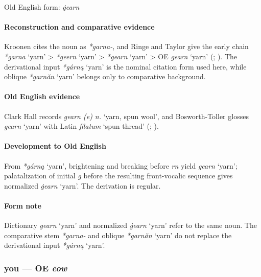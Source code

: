 \documentclass[
  british,
  a4paper,
]{article}
\providecommand{\Recon}[1]{\emph{*#1}}
\begin{document}
Old English form: \emph{ġearn}

\paragraph{Reconstruction and comparative
evidence}\label{reconstruction-and-comparative-evidence-83}

Kroonen cites the noun as \emph{*garna-}, and Ringe and Taylor give the
early chain \Recon{garna} `yarn' \textgreater{} \Recon{geern} `yarn'
\textgreater{} \Recon{gearn} `yarn' \textgreater{} OE {\emph{gearn}}
`yarn' (;
). The
derivational input \Recon{gárną} `yarn' is the nominal citation form
used here, while oblique \Recon{garnăn} `yarn' belongs only to
comparative background.

\paragraph{Old English evidence}\label{old-english-evidence-85}

Clark Hall records \emph{gearn (e) n.} `yarn, spun wool', and
Bosworth-Toller glosses {\emph{gearn}} `yarn' with Latin \emph{filatum}
`spun thread' (;
).

\paragraph{Development to Old
English}\label{development-to-old-english-83}

From \Recon{gárną} `yarn', brightening and breaking before \emph{rn}
yield \emph{gearn} `yarn'; palatalization of initial \emph{g} before the
resulting front-vocalic sequence gives normalized \emph{ġearn} `yarn'.
The derivation is regular.

\paragraph{Form note}\label{form-note-26}

Dictionary \emph{gearn} `yarn' and normalized \emph{ġearn} `yarn' refer
to the same noun. The comparative stem \emph{*garna-} and oblique
\Recon{garnăn} `yarn' do not replace the derivational input
\Recon{gárną} `yarn'.

\subsubsection{\texorpdfstring{you --- OE
\emph{ēow}}{you --- OE ēow}}\label{you-oe-ux113ow}
\end{document}
